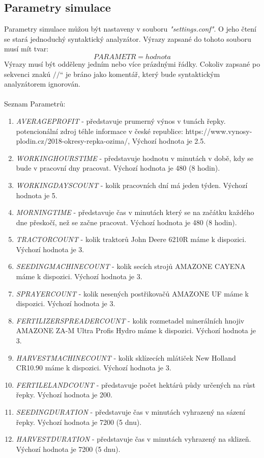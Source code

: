 \documentclass[11pt,a4paper,titlepage]{article}
\newcommand{\ceskeuvozovky}[1]{\quotedblbase#1\textquotedblleft}
\begin{document}
\subsection{Parametry simulace}
Parametry simulace můžou být nastaveny v souboru \emph{"settings.conf"}. O jeho čtení se stará jednoduchý syntaktický analyzátor. Výrazy zapsané do tohoto souboru musí mít tvar: $$PARAMETR = hodnota$$ Výrazy musí být odděleny jedním nebo více prázdnými řádky. Cokoliv zapsané po sekvenci znakú \ceskeuvozovky{$//$} je bráno jako komentář, který bude syntaktickým analyzátorem ignorován.
\\ \\
Seznam Parametrů:
\begin{enumerate}
    \item{\emph{AVERAGEPROFIT} - představuje prumerný výnos v tunách řepky. potencionální zdroj téhle informace v české republice: https://www.vynosy-plodin.cz/2018-okresy-repka-ozima/, Výchozí hodnota je 2.5.}
    \item{\emph{WORKINGHOURSTIME} - představuje hodnotu v minutách v době, kdy se bude v pracovní dny pracovat. Výchozí hodnota je 480 (8 hodin).}
    \item{\emph{WORKINGDAYSCOUNT} - kolik pracovních dní má jeden týden. Výchozí hodnota je 5.}
    \item{\emph{MORNINGTIME} - představuje čas v minutách který se na začátku každého dne přeskočí, než se začne pracovat. Výchozí hodnota je 480 (8 hodin).}
    \item{\emph{TRACTORCOUNT} - kolik traktorů John Deere 6210R máme k dispozici. Výchozí hodnota je 3.}
    \item{\emph{SEEDINGMACHINECOUNT} - kolik secích strojů AMAZONE CAYENA máme k dispozici. Výchozí hodnota je 3.}
    \item{\emph{SPRAYERCOUNT} - kolik nesených postřikovačů AMAZONE UF máme k dispozici. Výchozí hodnota je 3.}
    \item{\emph{FERTILIZERSPREADERCOUNT} - kolik rozmetadel minerálních hnojiv AMAZONE ZA-M Ultra Profis Hydro máme k dispozici. Výchozí hodnota je 3.}
    \item{\emph{HARVESTMACHINECOUNT} - kolik sklízecích mlátiček New Holland CR10.90 máme k dispozici. Výchozí hodnota je 3.}
    \item{\emph{FERTILELANDCOUNT} - představuje počet hektárů půdy určených na růst řepky. Výchozí hodnota je 200.}
    \item{\emph{SEEDINGDURATION} - představuje čas v minutách vyhrazený na sázení řepky. Výchozí hodnota je 7200 (5 dnu).}
    \item{\emph{HARVESTDURATION} - představuje čas v minutách vyhrazený na sklizeň. Výchozí hodnota je 7200 (5 dnu).}
\end{enumerate}
\end{document}

